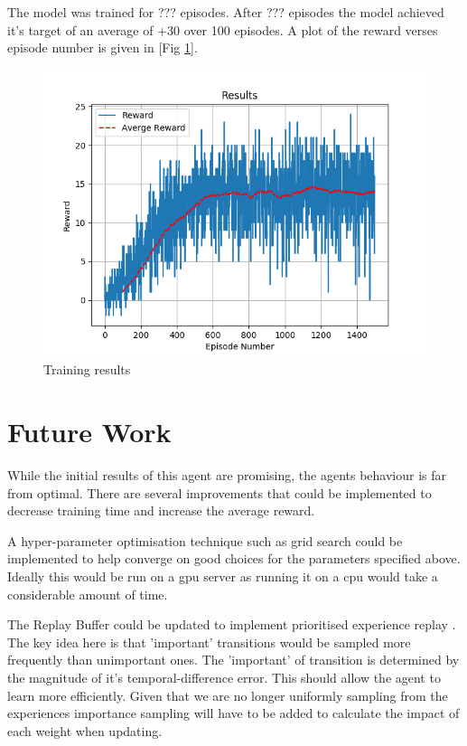 \documentclass[12pt]{article}
\begin{document}
The model was trained for ??? episodes. 
After ??? episodes the model achieved it's target of an average of +30 over 100 episodes.
A plot of the reward verses episode number is given in [Fig \ref{results}].

\begin{figure}
	\centering
	\includegraphics[width=0.8\linewidth]{./img/Results.png}
	\caption{Training results}
	\label{results}
\end{figure}


\section{Future Work}
While the initial results of this agent are promising, the agents behaviour is far from optimal.
There are several improvements that could be implemented to decrease training time and increase the average reward.

A hyper-parameter optimisation technique such as grid search could be implemented to help converge on good choices for the parameters 
specified above. 
Ideally this would be run on a gpu server as running it on a cpu would take a considerable amount of time.

The Replay Buffer could be updated to implement prioritised experience replay \cite{per_paper}. 
The key idea here is that 'important' transitions would be sampled more frequently than unimportant ones. 
The 'important' of transition is determined by the magnitude of it's temporal-difference error.
This should allow the agent to learn more efficiently. 
Given that we are no longer uniformly sampling from the experiences importance sampling will have to be added to calculate the impact of each weight when updating.
\printbibliography
\end{document}
